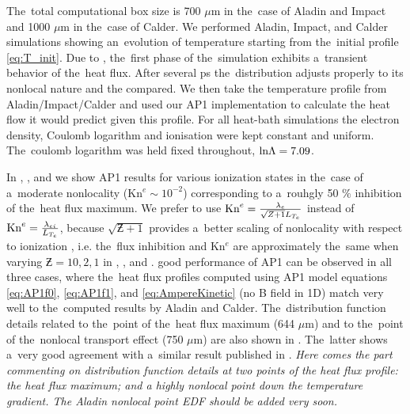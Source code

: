 
The~total computational box size is 700 $\mu$m in the~case
of Aladin and Impact and 1000 $\mu$m in the~case of Calder.
We performed Aladin, Impact, and Calder simulations showing an~evolution of
temperature starting from the~initial profile \eqref{eq:T_init}. 
Due to ,
the~first phase of the~simulation exhibits a~transient behavior of the~heat
flux. After several ps the~distribution adjusts properly to its nonlocal nature
and the  compared. 
We then take the temperature profile from Aladin/Impact/Calder and used 
our AP1 implementation to calculate the heat flow
it would predict given this profile. 
For all heat-bath simulations the electron density, Coulomb logarithm and 
ionisation were kept constant and uniform.
The~coulomb logarithm was held fixed throughout, $\text{ln}\Lambda = 7.09$.

In , , 
and  we show AP1 results for various ionization
states in the~case of a~moderate nonlocality (Kn$^e \sim 10^{-2}$) 
corresponding to a~rouhgly 50 $\%$ inhibition of the~heat flux maximum. 
We prefer to use 
$\text{Kn}^e = \frac{\lambda_e}{\sqrt{Z + 1}L_{T_e}}$ instead of
 $\text{Kn}^e = \frac{\lambda_{ei}}{L_{T_e}}$, because $\sqrt{\Zbar + 1}$ provides 
a~better scaling of nonlocality with respect
to ionization \cite{LMV_1983_7}, i.e. the~flux inhibition and Kn$^e$ are
approximately the~same when varying $\Zbar= 10, 2, 1$ in 
, 
, and .
 good performance of AP1 can be observed in all three cases,
where the~heat flux profiles computed using AP1 model equations 
\eqref{eq:AP1f0}, \eqref{eq:AP1f1}, and \eqref{eq:AmpereKinetic} 
(no B field in 1D) match very well to the~computed results 
by Aladin and Calder.
The~distribution function details related to the~point of 
the~heat flux maximum (644 $\mu$m) and to the~point of 
the~nonlocal transport effect (750 $\mu$m) are also shown 
in .
The~latter shows a~very good agreement with a~similar result published in
\cite{Sherlock_PoP2017}.
\textit{Here comes the part commenting on distribution function details at 
two points of the heat flux profile: the heat flux maximum; and a highly 
nonlocal point down the temperature gradient. 
The Aladin nonlocal point EDF should be added very soon.}

